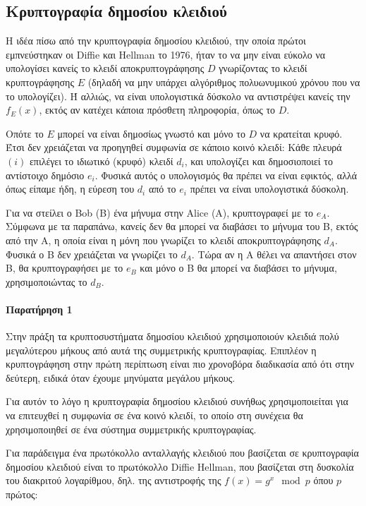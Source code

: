 \subsection{Κρυπτογραφία δημοσίου κλειδιού}

Η ιδέα πίσω από την κρυπτογραφία δημοσίου κλειδιού, την οποία πρώτοι εμπνεύστηκαν οι Diffie και Hellman το 1976, ήταν το να μην είναι εύκολο να υπολογίσει κανείς το κλειδί αποκρυπτογράφησης $D$ γνωρίζοντας το κλειδί κρυπτογράφησης $E$  (δηλαδή να μην υπάρχει αλγόριθμος πολυωνυμικού χρόνου που να το υπολογίζει). Ή αλλιώς, να είναι υπολογιστικά δύσκολο να αντιστρέψει κανείς την $f_{E}(x)$, εκτός αν κατέχει κάποια πρόσθετη πληροφορία, όπως το $D$. 

Οπότε το $E$ μπορεί να είναι δημοσίως γνωστό και μόνο το $D$ να κρατείται κρυφό. Έτσι δεν χρειάζεται να προηγηθεί συμφωνία σε κάποιο κοινό κλειδί: Κάθε πλευρά $(i)$ επιλέγει το ιδιωτικό (κρυφό) κλειδί $d_{i}$, και υπολογίζει και δημοσιοποιεί το αντίστοιχο δημόσιο $e_{i}$. Φυσικά αυτός ο υπολογισμός θα πρέπει να είναι εφικτός, αλλά όπως είπαμε ήδη, η εύρεση του $d_{i}$ από το $e_{i}$ πρέπει να είναι υπολογιστικά δύσκολη.

Για να στείλει ο Bob (B) ένα μήνυμα στην Alice (A), κρυπτογραφεί με το $e_{A}$. Σύμφωνα με τα παραπάνω, κανείς δεν θα μπορεί να διαβάσει το μήνυμα του Β, εκτός από την Α, η οποία είναι η μόνη που γνωρίζει το κλειδί αποκρυπτογράφησης $d_{A}$. Φυσικά ο Β δεν χρειάζεται να γνωρίζει το $d_{A}$. Τώρα αν η Α θέλει να απαντήσει στον Β, θα κρυπτογραφήσει με το $e_{B}$ και μόνο ο Β θα μπορεί να διαβάσει το μήνυμα, χρησιμοποιώντας το $d_{B}$.


\paragraph{Παρατήρηση 1}Στην πράξη τα κρυπτοσυστήματα δημοσίου κλειδιού χρησιμοποιούν κλειδιά πολύ μεγαλύτερου μήκους από αυτά της συμμετρικής κρυπτογραφίας. Επιπλέον η κρυπτογράφηση στην πρώτη περίπτωση είναι πιο χρονοβόρα διαδικασία από ότι στην δεύτερη, ειδικά όταν έχουμε μηνύματα μεγάλου μήκους.

Για αυτόν το λόγο η κρυπτογραφία δημοσίου κλειδιού συνήθως χρησιμοποιείται για να επιτευχθεί η συμφωνία σε ένα κοινό κλειδί, το οποίο στη συνέχεια θα χρησιμοποιηθεί σε ένα σύστημα συμμετρικής κρυπτογραφίας.

Για παράδειγμα ένα πρωτόκολλο ανταλλαγής κλειδιού που βασίζεται σε κρυπτογραφία δημοσίου κλειδιού είναι το πρωτόκολλο Diffie Hellman, που βασίζεται στη δυσκολία του διακριτού λογαρίθμου, δηλ. της αντιστροφής της $f(x)=g^x \mod p$ όπου $p$ πρώτος:

